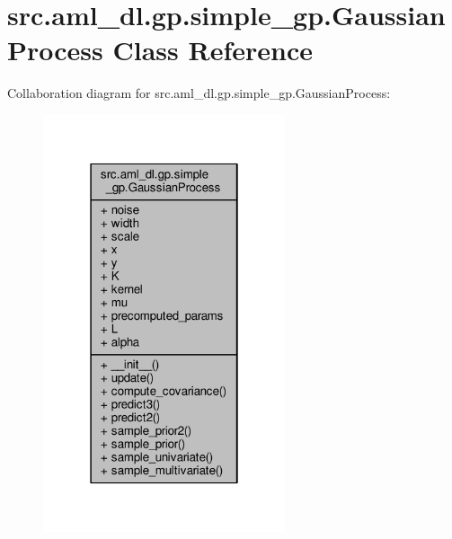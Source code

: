 \hypertarget{classsrc_1_1aml__dl_1_1gp_1_1simple__gp_1_1_gaussian_process}{\section{src.\-aml\-\_\-dl.\-gp.\-simple\-\_\-gp.\-Gaussian\-Process Class Reference}
\label{classsrc_1_1aml__dl_1_1gp_1_1simple__gp_1_1_gaussian_process}
}


Collaboration diagram for src.\-aml\-\_\-dl.\-gp.\-simple\-\_\-gp.\-Gaussian\-Process\-:
\nopagebreak
\begin{figure}[H]
\begin{center}
\leavevmode
\includegraphics[width=202pt]{classsrc_1_1aml__dl_1_1gp_1_1simple__gp_1_1_gaussian_process__coll__graph}
\end{center}
\end{figure}
